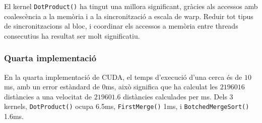 \documentclass[catalan,10pt,a4paper]{article}
\begin{document}
El kernel \verb|DotProduct()| ha tingut una millora significant, gràcies als accessos amb coalescència a la memòria i a la sincronització a escala de warp. Reduir tot tipus de sincronitzacions al bloc, i coordinar els accessos a memòria entre threads consecutius ha resultat ser molt significatiu.
\subsubsection*{Quarta implementació}
En la quarta implementació de CUDA, el temps d'execució d'una cerca és de $10$ms, amb un error estàndard de $0$ms, això significa que ha calculat les $2196016$ distàncies a una velocitat de $219601.6$ distàncies calculades per ms. Dels 3 kernels, \verb|DotProduct()| ocupa 6.5ms, \verb|FirstMerge()| 1ms, i \verb|BotchedMergeSort()| 1.6ms.
 
\end{document}
